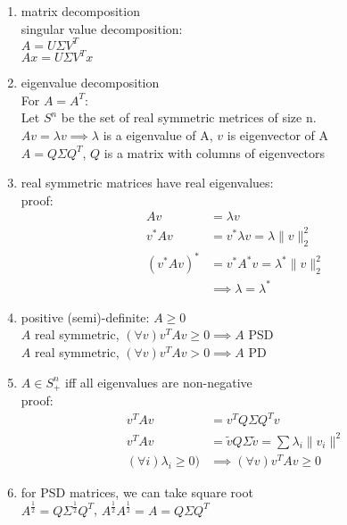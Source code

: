 \documentclass[12pt,letter]{article}
\begin{document}

\begin{enumerate}
\item matrix decomposition\\
  singular value decomposition:\\
  $A=U\Sigma V^T$\\
  $Ax=U\Sigma V^Tx$
\item eigenvalue decomposition\\
  For $A=A^T$:\\
  Let $S^n$ be the set of real symmetric metrices of size n.\\
  $Av=\lambda v \implies \lambda$ is a eigenvalue of A, $v$ is eigenvector of A\\
  $A=Q\Sigma Q^T$, $Q$ is a matrix with columns of eigenvectors\\
\item real symmetric matrices have real eigenvalues:\\
  proof:
  \begin{align*}
    Av&=\lambda v\\ 
    v^*Av&=v^*\lambda v=\lambda \|v\|_2^2\\
    (v^* A v)^*&= v^* A^* v = \lambda^* \|v\|_2^2\\
      &\implies \lambda = \lambda^*
    \end{align*}
\item positive (semi)-definite: $A\geq 0$\\
  $A$ real symmetric, $(\forall v) v^TAv \geq 0 \implies A$  PSD\\
  $A$ real symmetric, $(\forall v) v^TAv > 0 \implies A$ PD\\
\item $A \in S_+^n$ iff all eigenvalues are non-negative\\
  proof:\\
  \begin{align*}
    v^T A v &= v^T Q \Sigma Q^T v\\
    v^T A v &= \tilde{v} Q \Sigma \tilde{v}=\sum \lambda_i \|v_i\|^2\\
    (\forall i) \lambda_i \geq 0) & \implies (\forall v)v^T A v \geq 0
  \end{align*}
\item for PSD matrices, we can take square root\\
  $A^{\frac{1}{2}}=Q\Sigma^{\frac{1}{2}} Q^T$, $A^{\frac{1}{2}}A^{\frac{1}{2}}=A=Q\Sigma Q^T$\\


\end{enumerate}
\end{document}

